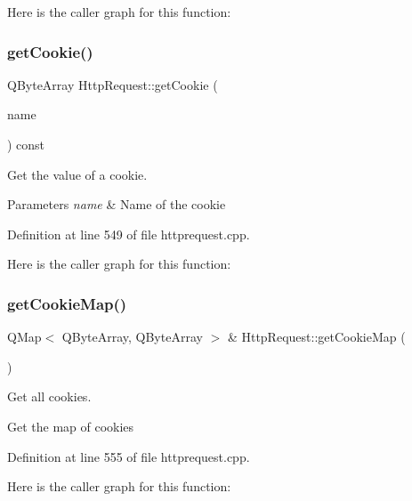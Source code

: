 Here is the caller graph for this function\+:
\mbox{\label{classstefanfrings_1_1_http_request_a8df857484bbe4cc8362ddd49a604f649}} 
\subsubsection{\texorpdfstring{get\+Cookie()}{getCookie()}}
{\footnotesize\ttfamily Q\+Byte\+Array Http\+Request\+::get\+Cookie (\begin{DoxyParamCaption}\item[{const Q\+Byte\+Array \&}]{name }\end{DoxyParamCaption}) const}

Get the value of a cookie. 
\begin{DoxyParams}{Parameters}
{\em name} & Name of the cookie \\
\hline
\end{DoxyParams}


Definition at line 549 of file httprequest.\+cpp.

Here is the caller graph for this function\+:
\mbox{\label{classstefanfrings_1_1_http_request_a408b9110494fbeb1d5e1140bc2a49112}} 
\subsubsection{\texorpdfstring{get\+Cookie\+Map()}{getCookieMap()}}
{\footnotesize\ttfamily Q\+Map$<$ Q\+Byte\+Array, Q\+Byte\+Array $>$ \& Http\+Request\+::get\+Cookie\+Map (\begin{DoxyParamCaption}{ }\end{DoxyParamCaption})}

Get all cookies.

Get the map of cookies 

Definition at line 555 of file httprequest.\+cpp.

Here is the caller graph for this function\+:
\mbox{\label{classstefanfrings_1_1_http_request_a490265254cf6ad8b642205aef325d4da}} 
